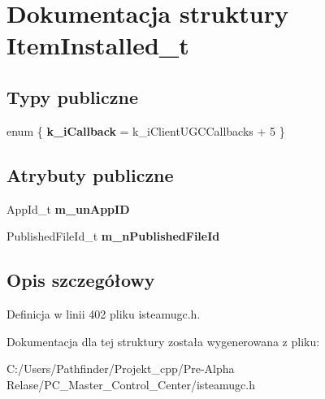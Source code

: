 \hypertarget{struct_item_installed__t}{}\section{Dokumentacja struktury Item\+Installed\+\_\+t}
\label{struct_item_installed__t}
\subsection*{Typy publiczne}
\begin{DoxyCompactItemize}
\item 
\mbox{\label{struct_item_installed__t_a73980748189b1107d039b16dd4e2e121}} 
enum \{ {\bfseries k\+\_\+i\+Callback} = k\+\_\+i\+Client\+U\+G\+C\+Callbacks + 5
 \}
\end{DoxyCompactItemize}
\subsection*{Atrybuty publiczne}
\begin{DoxyCompactItemize}
\item 
\mbox{\label{struct_item_installed__t_a405ff3559800d70aeb52e95e513b950d}} 
App\+Id\+\_\+t {\bfseries m\+\_\+un\+App\+ID}
\item 
\mbox{\label{struct_item_installed__t_a8450a9bb9ec0e07a168c1426deb757b2}} 
Published\+File\+Id\+\_\+t {\bfseries m\+\_\+n\+Published\+File\+Id}
\end{DoxyCompactItemize}


\subsection{Opis szczegółowy}


Definicja w linii 402 pliku isteamugc.\+h.



Dokumentacja dla tej struktury została wygenerowana z pliku\+:\begin{DoxyCompactItemize}
\item 
C\+:/\+Users/\+Pathfinder/\+Projekt\+\_\+cpp/\+Pre-\/\+Alpha Relase/\+P\+C\+\_\+\+Master\+\_\+\+Control\+\_\+\+Center/isteamugc.\+h\end{DoxyCompactItemize}
